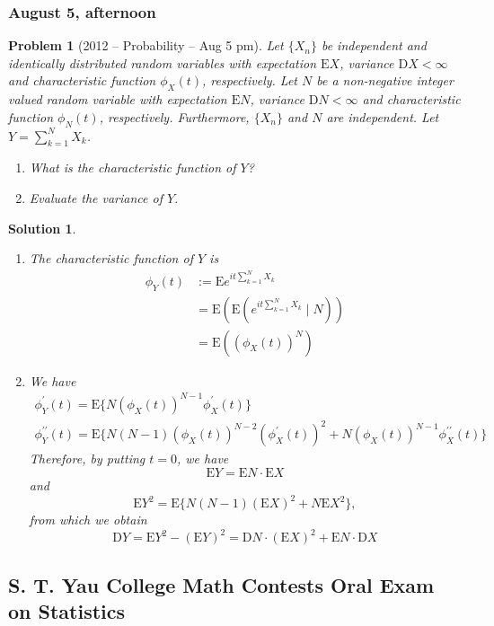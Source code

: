 \documentclass[12pt]{amsart}
\newtheorem{problem}{Problem}
\newtheorem*{solution}{Solution}
\begin{document}
\subsubsection*{August 5, afternoon}
\begin{problem}[2012 -- Probability -- Aug 5 pm]
Let $\{X_n\}$ be independent and identically distributed random variables with expectation $\mathrm{E} X$, variance $\mathrm{D} X<\infty$ and characteristic function $\phi_X(t)$, respectively. Let $N$ be a non-negative integer valued random variable with expectation $\mathrm{E} N$, variance $\mathrm{D} N<\infty$ and characteristic function $\phi_N(t)$, respectively. Furthermore, $\{X_n\}$ and $N$ are independent. Let $Y=\sum_{k=1}^N X_k$.
\begin{enumerate}[label=(\alph*)]
\item What is the characteristic function of $Y$?
\item Evaluate the variance of $Y$.
\end{enumerate}
\end{problem}
\begin{solution}
\begin{enumerate}[label=(\alph*)]
\item The characteristic function of $Y$ is
\begin{align*}
\phi_Y(t) & :=\mathrm{E} e^{i t \sum_{k=1}^N X_k} \\
& =\mathrm{E}(\mathrm{E}(e^{i t \sum_{k=1}^N X_k} \mid N)) \\
& =\mathrm{E}((\phi_X(t))^N)
\end{align*}
\item We have
\begin{gather*}
\phi_Y^{\prime}(t)=\mathrm{E}\{N(\phi_X(t))^{N-1} \phi_X^{\prime}(t)\} \\
\phi_Y^{\prime \prime}(t)=\mathrm{E}\{N(N-1)(\phi_X(t))^{N-2}(\phi_X^{\prime}(t))^2+N(\phi_X(t))^{N-1} \phi_X^{\prime \prime}(t)\}
\end{gather*}
Therefore, by putting $t=0$, we have
$$
\mathrm{E} Y=\mathrm{E} N \cdot \mathrm{E} X
$$
and
$$
\mathrm{E} Y^2=\mathrm{E}\{N(N-1)(\mathrm{E} X)^2+N \mathrm{E} X^2\},
$$
from which we obtain
$$
\mathrm{D} Y=\mathrm{E} Y^2-(\mathrm{E} Y)^2=\mathrm{D} N \cdot(\mathrm{E} X)^2+\mathrm{E} N \cdot \mathrm{D} X
$$
\end{enumerate}
\end{solution}

\subsection*{S. T. Yau College Math Contests Oral Exam on Statistics}
\end{document}
